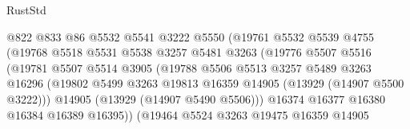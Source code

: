 \begin{lexlean}{RustStd}
\begin{coremodule}
                                    @822
                                    @833
                                    @86
                                    @5532
                                    @5541
                                    @3222
                                    @5550
                                    (@19761
                                      @5532
                                      @5539
                                      @4755
                                      (@19768
                                        @5518
                                        @5531
                                        @5538
                                        @3257
                                        @5481
                                        @3263
                                        (@19776
                                          @5507
                                          @5516
                                          (@19781
                                            @5507
                                            @5514
                                            @3905
                                            (@19788
                                              @5506
                                              @5513
                                              @3257
                                              @5489
                                              @3263
                                              @16296
                                              (@19802
                                                @5499
                                                @3263
                                                @19813
                                                @16359
                                                @14905
                                                (@13929 (@14907 @5500 @3222)))
                                              @14905
                                              (@13929 (@14907 @5490 @5506)))
                                            @16374
                                            @16377
                                            @16380
                                            @16384
                                            @16389
                                            @16395))
                                        (@19464
                                          @5524
                                          @3263
                                          @19475
                                          @16359
                                          @14905

\end{coremodule}
\end{lexlean}
